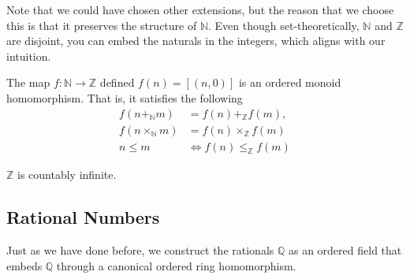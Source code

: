   Note that we could have chosen other extensions, but the reason that we choose this is that it preserves the structure of $\mathbb{N}$. Even though set-theoretically, $\mathbb{N}$ and $\mathbb{Z}$ are disjoint, you can embed the naturals in the integers, which aligns with our intuition. 

  \begin{theorem}
    The map $f: \mathbb{N} \rightarrow \mathbb{Z}$ defined $f(n) = [(n, 0)]$ is an ordered monoid homomorphism. That is, it satisfies the following
    \begin{align}
      f(n +_{\mathbb{N}} m) & = f(n)+_{\mathbb{Z}}f(m), \\
      f(n \times_{\mathbb{N}} m) & = f(n)\times_{\mathbb{Z}}f(m) \\
      n\leq m & \iff f(n)\leq_{\mathbb{Z}} f(m)
    \end{align}
  \end{theorem}

  \begin{theorem}[Countability]
    $\mathbb{Z}$ is countably infinite. 
  \end{theorem}

\subsection{Rational Numbers} 

  Just as we have done before, we construct the rationals $\mathbb{Q}$ as an ordered field that embeds $\mathbb{Q}$ through a canonical ordered ring homomorphism. 

